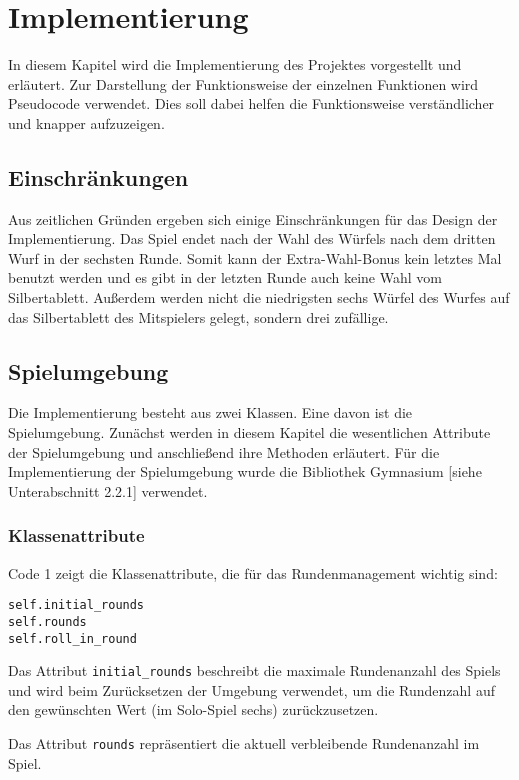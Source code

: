 \section{Implementierung}
In diesem Kapitel wird die Implementierung des Projektes vorgestellt und erläutert. Zur Darstellung der Funktionsweise der einzelnen Funktionen wird Pseudocode verwendet. Dies soll dabei helfen die Funktionsweise verständlicher und knapper aufzuzeigen.
\subsection{Einschränkungen}
Aus zeitlichen Gründen ergeben sich einige Einschränkungen für das Design der Implementierung. Das Spiel endet nach der Wahl des Würfels nach dem dritten Wurf in der sechsten Runde. Somit kann der Extra-Wahl-Bonus kein letztes Mal benutzt werden und es gibt in der letzten Runde auch keine Wahl vom Silbertablett. Außerdem werden nicht die niedrigsten sechs Würfel des Wurfes auf das Silbertablett des Mitspielers gelegt, sondern drei zufällige.
\subsection{Spielumgebung}
Die Implementierung besteht aus zwei Klassen. Eine davon ist die Spielumgebung. Zunächst werden in diesem Kapitel die wesentlichen Attribute der Spielumgebung und anschließend ihre Methoden erläutert. Für die Implementierung der Spielumgebung wurde die Bibliothek Gymnasium [siehe Unterabschnitt 2.2.1] verwendet.
\subsubsection{Klassenattribute}
\begin{minipage}{\linewidth}
Code 1 zeigt die Klassenattribute, die für das Rundenmanagement wichtig sind:
\vspace{0.5cm}
\begin{lstlisting}[caption={Klassenattribute für das Runden-System}, basicstyle=\ttfamily]
self.initial_rounds
self.rounds
self.roll_in_round
\end{lstlisting}
\end{minipage}

Das Attribut \texttt{initial\_rounds} beschreibt die maximale Rundenanzahl des Spiels und wird beim Zurücksetzen der Umgebung verwendet, um die Rundenzahl auf den gewünschten Wert (im Solo-Spiel sechs) zurückzusetzen.

Das Attribut \texttt{rounds} repräsentiert die aktuell verbleibende Rundenanzahl im Spiel.

